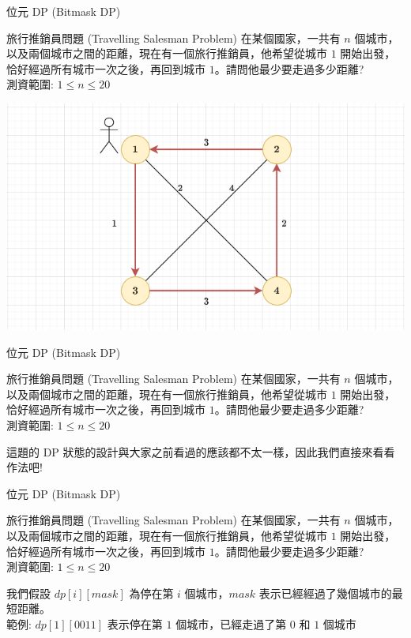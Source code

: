 \documentclass[aspectratio=169]{beamer}
\begin{document}
\begin{frame}[fragile]{位元 DP (Bitmask DP)}
    \begin{block}{旅行推銷員問題 (Travelling Salesman Problem)}
        在某個國家，一共有 $n$ 個城市，以及兩個城市之間的距離，現在有一個旅行推銷員，他希望從城市 $1$ 開始出發，恰好經過所有城市一次之後，再回到城市 $1$。請問他最少要走過多少距離?\\
        \vspace{5mm}
        測資範圍: $1 \le n \le 20$
    \end{block} 
    \begin{center}
        \includegraphics[scale=0.4]{images/TSP2.png}
    \end{center}
\end{frame}

\begin{frame}[fragile]{位元 DP (Bitmask DP)}
    \begin{block}{旅行推銷員問題 (Travelling Salesman Problem)}
        在某個國家，一共有 $n$ 個城市，以及兩個城市之間的距離，現在有一個旅行推銷員，他希望從城市 $1$ 開始出發，恰好經過所有城市一次之後，再回到城市 $1$。請問他最少要走過多少距離?\\
        \vspace{5mm}
        測資範圍: $1 \le n \le 20$
    \end{block} 
    這題的 DP 狀態的設計與大家之前看過的應該都不太一樣，因此我們直接來看看作法吧!
\end{frame}

\begin{frame}[fragile]{位元 DP (Bitmask DP)}
    \begin{block}{旅行推銷員問題 (Travelling Salesman Problem)}
        在某個國家，一共有 $n$ 個城市，以及兩個城市之間的距離，現在有一個旅行推銷員，他希望從城市 $1$ 開始出發，恰好經過所有城市一次之後，再回到城市 $1$。請問他最少要走過多少距離?\\
        \vspace{5mm}
        測資範圍: $1 \le n \le 20$
    \end{block} 
    我們假設 $dp[i][mask]$ 為停在第 $i$ 個城市，$mask$ 表示已經經過了幾個城市的最短距離。 \\ \pause
    範例: $dp[1][0011]$ 表示停在第 $1$ 個城市，已經走過了第 $0$ 和 $1$ 個城市
\end{frame}
\end{document}

